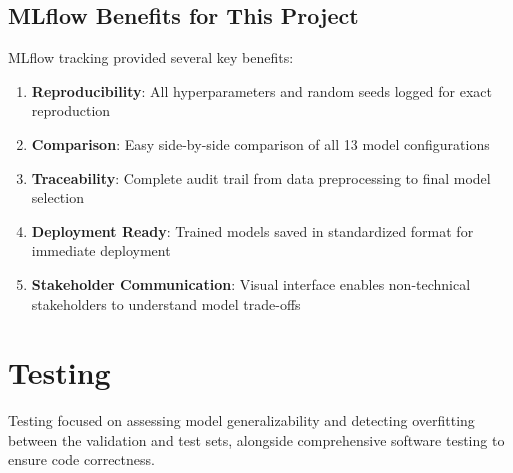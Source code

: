 \documentclass[12pt, a4paper]{article}
\begin{document}
\subsection{MLflow Benefits for This Project}
MLflow tracking provided several key benefits:
\begin{enumerate}
    \item \textbf{Reproducibility}: All hyperparameters and random seeds logged for exact reproduction
    \item \textbf{Comparison}: Easy side-by-side comparison of all 13 model configurations
    \item \textbf{Traceability}: Complete audit trail from data preprocessing to final model selection
    \item \textbf{Deployment Ready}: Trained models saved in standardized format for immediate deployment
    \item \textbf{Stakeholder Communication}: Visual interface enables non-technical stakeholders to understand model trade-offs
\end{enumerate}

\newpage
\section{Testing}
Testing focused on assessing model generalizability and detecting overfitting between the validation and test sets, alongside comprehensive software testing to ensure code correctness.
\end{document}
